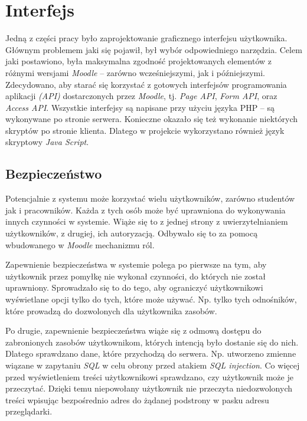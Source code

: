 
\section{Interfejs}
\label{Chapter65}

Jedną z części pracy było zaprojektowanie graficznego interfejsu użytkownika. Głównym problemem jaki się pojawił, był wybór odpowiedniego narzędzia. Celem jaki postawiono, była maksymalna zgodność projektowanych elementów z różnymi wersjami \emph{Moodle} -- zarówno wcześniejszymi, jak i późniejszymi. Zdecydowano, aby starać się korzystać z gotowych interfejsów programowania aplikacji \emph{(API)} dostarczonych przez \emph{Moodle}, tj. \emph{Page API}, \emph{Form API}, oraz \emph{Access API}. Wszystkie interfejsy są napisane przy użyciu języka PHP -- są wykonywane po stronie serwera. Konieczne okazało się też wykonanie niektórych skryptów po stronie klienta. Dlatego w projekcie wykorzystano również język skryptowy \emph{Java Script}.

\subsection{Bezpieczeństwo}

Potencjalnie z systemu może korzystać wielu użytkowników, zarówno studentów jak i pracowników. Każda z tych osób może być uprawniona do wykonywania innych czynności w systemie. Wiąże się to z jednej strony z uwierzytelnianiem użytkowników, z drugiej, ich autoryzacją. Odbywało się to za pomocą wbudowanego w \emph{Moodle} mechanizmu ról.

Zapewnienie bezpieczeństwa w systemie polega po pierwsze na tym, aby użytkownik przez pomyłkę nie wykonał czynności, do których nie został uprawniony. Sprowadzało się to do tego, aby ograniczyć użytkownikowi wyświetlane opcji tylko do tych, które może używać. Np. tylko tych odnośników, które prowadzą do dozwolonych dla użytkownika zasobów.

Po drugie, zapewnienie bezpieczeństwa wiąże się z odmową dostępu do zabronionych zasobów użytkownikom, których intencją było dostanie się do nich. Dlatego sprawdzano dane, które przychodzą do serwera. Np. utworzeno zmienne wiązane w zapytaniu \emph{SQL} w celu obrony przed atakiem \emph{SQL injection}. Co więcej przed wyświetleniem treści użytkownikowi sprawdzano, czy użytkownik może je przeczytać. Dzięki temu niepowołany użytkownik nie przeczyta niedozwolonych treści wpisując bezpośrednio adres do żądanej podstrony w pasku adresu przeglądarki.